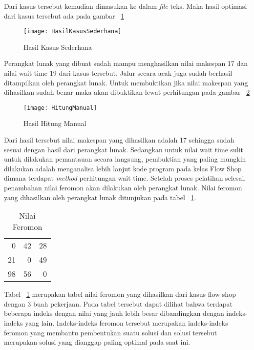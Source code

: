 Dari kasus tersebut kemudian dimasukan ke dalam \textit{file} teks.
Maka hasil optimasi dari kasus tersebut ada pada gambar ~\ref{fig:hasilkasussederhana}

\begin{figure}[H]
	\centering
	\texttt{[image: HasilKasusSederhana]}
	\caption[Hasil Kasus Sederhanai]{Hasil Kasus Sederhana}
	\label{fig:hasilkasussederhana}
\end{figure}

Perangkat lunak yang dibuat sudah mampu menghasilkan nilai makespan 17 dan nilai wait time 19 dari kasus tersebut. Jalur secara acak juga sudah berhasil ditampilkan oleh perangkat lunak. Untuk membuktikan jika nilai makespan yang dihasilkan sudah benar maka akan dibuktikan lewat perhitungan pada gambar ~\ref{fig:hasilhitungmanual}

\begin{figure}[H]
	\centering
	\texttt{[image: HitungManual]}
	\caption[Hasil Hitung Manual]{Hasil Hitung Manual}
	\label{fig:hasilhitungmanual}
\end{figure}

Dari hasil tersebut nilai makespan yang dihasilkan adalah 17 sehingga sudah sesuai dengan hasil dari perangkat lunak. Sedangkan untuk nilai wait time
sulit untuk dilakukan pemantauan secara langsung, pembuktian yang paling mungkin dilakukan adalah menganalisa lebih lanjut kode program pada kelas Flow
Shop dimana terdapat \textit{method} perhitungan wait time. Setelah proses pelatihan selesai, penambahan nilai feromon akan dilakukan oleh perangkat lunak.
Nilai feromon yang dihasilkan oleh perangkat lunak ditunjukan pada  tabel ~\ref{tab:nilaiferomon}.
\begin{table}[H]
	\centering
	\caption{Nilai Feromon}
	\begin{tabular}{rrr}
		0     & 42    & 28 \\
		21    & 0     & 49 \\
		98    & 56    & 0 \\
	\end{tabular}%
	\label{tab:nilaiferomon}%
\end{table}%

Tabel ~\ref{tab:nilaiferomon} merupakan tabel nilai feromon yang dihasilkan dari kasus flow shop dengan 3 buah pekerjaan. Pada tabel tersebut dapat dilihat bahwa terdapat beberapa indeks dengan nilai yang jauh lebih besar dibandingkan dengan indeks-indeks yang lain. Indeks-indeks feromon tersebut merupakan indeks-indeks feromon yang membantu pembentukan suatu solusi dan solusi tersebut merupakan solusi yang dianggap paling optimal pada saat ini.


